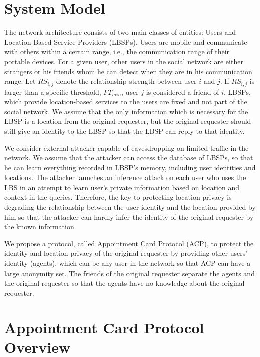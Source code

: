 \documentclass[conference]{IEEEtran}
\begin{document}
\section{ System Model}

\noindent The network architecture consists of two main classes of entities: Users and Location-Based Service Providers (LBSPs). Users are mobile and communicate with others within a certain range, i.e., the communication range of their portable devices. For a given user, other users in the social network are either strangers or his friends whom he can detect when they are in his communication range. Let ${RS}_{i,j}$ denote the relationship strength between user $i$ and $j$. If ${RS}_{i,j}$ is larger than a specific threshold, ${FT}_{min}$, user $j$ is considered a friend of $i$. LBSPs, which provide location-based services to the users are fixed and not part of the social network. We assume that the only information which is necessary for the LBSP is a location from the original requester, but the original requester should still give an identity to the LBSP so that the LBSP can reply to that identity.

We consider external attacker capable of eavesdropping on limited traffic in the network. We assume that the attacker can access the database of LBSPs, so that he can learn everything recorded in LBSP's memory, including user identities and locations. The attacker launches an inference attack on each user who uses the LBS in an attempt to learn user's private information based on location and context in the queries. Therefore, the key to protecting location-privacy is degrading the relationship between the user identity and the location provided by him so that the attacker can hardly infer the identity of the original requester by the known information. 

We propose a protocol, called Appointment Card Protocol (ACP), to protect the identity and location-privacy of the original requester by providing other users' identity (agents), which can be any user in the network so that ACP can have a large anonymity set. The friends of the original requester separate the agents and the original requester so that the agents have no knowledge about the original requester.


\section{ Appointment Card Protocol Overview}
\end{document}

